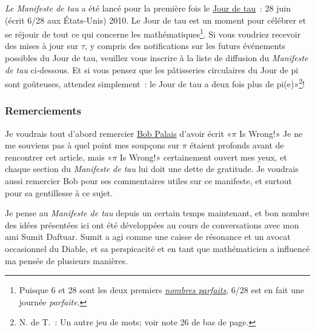 \emph{Le Manifeste de tau} a été lancé pour la première fois le
\href{https://tauday.com/}{Jour de tau}~: 28 juin (écrit 6/28 aux États-Unis)
2010. Le Jour de tau est un moment pour célébrer et se réjouir de tout ce qui
concerne les mathématiques\ns\footnote{Puisque 6 et 28 sont les deux premiers
\href{https://fr.wikipedia.org/wiki/Nombre_parfait}{\emph{nombres parfaits}},
6/28 est en fait une journée \emph{parfaite}.}. Si vous voudriez recevoir des
mises à jour sur $\tau$, y compris des notifications sur les futurs événements
possibles du Jour de tau, veuillez vous inscrire à la liste de diffusion du
\emph{Manifeste de tau} ci-dessous. Et si vous pensez que les pâtisseries
circulaires du Jour de pi sont goûteuses, attendez simplement~: le Jour de tau a
deux fois plus de \og pi(e)\ns »\ns\footnote{N. de T.~: Un autre jeu de mots\ns;
voir note 26 de bas de page.}\ns!


  \subsubsection{Remerciements} %
  \label{sec:acknowledgments}

Je voudrais tout d'abord remercier \href{https://www.math.utah.edu/~palais}{Bob
Palais} d'avoir écrit «\ns $\pi$ Is Wrong!\ns » Je ne me souviens pas à quel point
mes soupçons sur $\pi$ étaient profonds avant de rencontrer cet article, mais
«\ns $\pi$ Is Wrong!\ns » certainement ouvert mes yeux, et chaque section du
\emph{Manifeste de tau} lui doit une dette de gratitude. Je voudrais aussi
remercier Bob pour ses commentaires utiles sur ce manifeste, et surtout pour sa
gentillesse à ce sujet.

Je pense au \emph{Manifeste de tau} depuis un certain temps maintenant, et bon
nombre des idées présentées ici ont été développées au cours de conversations
avec mon ami Sumit Daftuar. Sumit a agi comme une caisse de résonance et un
avocat occasionnel du Diable, et sa perspicacité et en tant que mathématicien a
influencé ma pensée de plusieurs manières.

